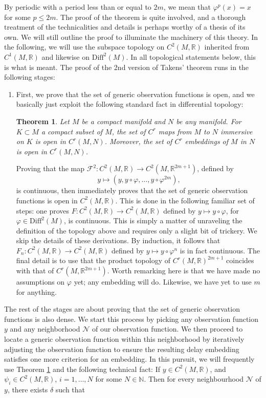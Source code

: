 \documentclass[11pt, a4paper]{memoir}
\theoremstyle{break}
\newtheorem{thm}{Theorem}
\theoremstyle{break}
\theoremstyle{nonumberplain}
\newcommand{\mN}{\mathbb{N}}
\newcommand{\mR}{\mathbb{R}}
\begin{document}
By periodic with a period less than or equal to $2m$, we mean that $\varphi^{p}(x)=x$ for some $p\leqslant 2m$. The proof of the theorem is quite involved, and a thorough treatment of the technicalities and details is perhaps worthy of a thesis of its own. We will still outline the proof to illuminate the machinery of this theory. In the following, we will use the subspace topology on $C^2(M,\mR)$ inherited from $C^1(M,\mR)$ and likewise on $\text{Diff}^2(M)$. In all topological statements below, this is what is meant. The proof of the 2nd version of Takens' theorem runs in the following stages:
\begin{enumerate}[label=\roman*)]
	\item First, we prove that the set of generic observation functions is open, and we basically just exploit the following standard fact in differential topology:
	\begin{thm}\label{tool}
	Let $M$ be a compact manifold and $N$ be any manifold. For $K\subset M$ a compact subset of $M$, the set of $C^r$ maps from $M$ to $N$ immersive on $K$ is open in $C^r(M,N)$. Moreover, the set of $C^r$ embeddings of $M$ in $N$ is open in $C^r(M,N)$. \cite{hirsch}
	\end{thm}
	Proving that the map $\mathcal{F}^2: C^2(M,\mR)\to C^2(M,\mR^{2m+1})$, defined by $$y\mapsto (y,y\circ\varphi,\ldots, y\circ \varphi^{2m}),$$ 
	is continuous, then immediately proves that the set of generic observation functions is open in $C^2(M,\mR)$. This is done in the following familiar set of steps: one proves $F: C^2(M,\mR)\to C^2(M,\mR)$ defined by $y\mapsto y\circ\varphi$, for $\varphi\in \text{Diff}^2(M)$, is continuous. This is simply a matter of unraveling the definition of the topology above and requires only a slight bit of trickery. We skip the details of these derivations. By induction, it follows that $F_n:  C^2(M,\mR)\to C^2(M,\mR)$ defined by $y\mapsto y\circ\varphi^n$ is in fact continuous.  The final detail is to use that the product topology of $C^r(M,\mR)^{2m+1}$ coincides with that of $C^r(M,\mR^{2m+1})$. Worth remarking here is that we have made no assumptions on $\varphi$ yet; any embedding will do. Likewise, we have yet to use $m$ for anything. 
\end{enumerate}
The rest of the stages are about proving that the set of generic observation functions is also dense. We start this process by picking any observation function $y$ and any neighborhood $\mathcal{N}$ of our observation function. We then proceed to locate a generic observation function within this neighborhood by iteratively adjusting the observation function to ensure the resulting delay embedding satisfies one more criterion for an embedding. In this pursuit, we will frequently use Theorem \ref{tool} and the following technical fact: If $y\in C^2(M,\mR)$, and $\psi_i\in C^2(M,\mR)$, $i=1,\ldots,N$ for some $N\in \mN$. Then for every neighbourhood $\mathcal{N}$ of $y$, there exists $\delta$ such that
\end{document}
